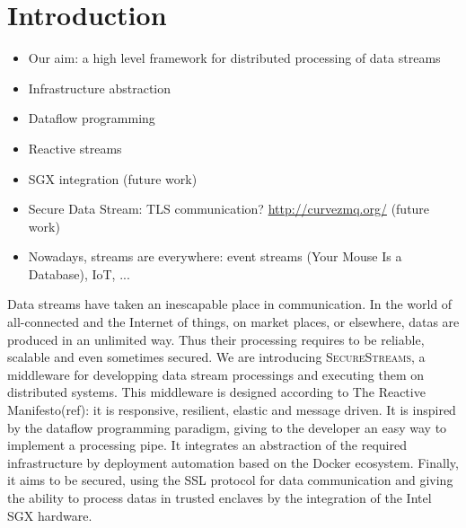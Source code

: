 \section{Introduction}
\label{sec:introduction}

\begin{itemize}
  \item Our aim: a high level framework for distributed processing of data streams
  \item Infrastructure abstraction
  \item Dataflow programming
  \item Reactive streams
  \item SGX integration (future work)
  \item Secure Data Stream: TLS communication? \url{http://curvezmq.org/} (future work)
  \item Nowadays, streams are everywhere: event streams (Your Mouse Is a Database), IoT, ...
\end{itemize}

Data streams have taken an inescapable place in communication.
In the world of all-connected and the Internet of things, on market places, or elsewhere, datas are produced in an unlimited way.
Thus their processing requires to be reliable, scalable and even sometimes secured.
We are introducing \textsc{SecureStreams}, a middleware for developping data stream processings and executing them on distributed systems.
This middleware is designed according to The Reactive Manifesto(ref): it is responsive, resilient, elastic and message driven.
It is inspired by the dataflow programming paradigm, giving to the developer an easy way to implement a processing pipe.
It integrates an abstraction of the required infrastructure by deployment automation based on the Docker ecosystem.
Finally, it aims to be secured, using the SSL protocol for data communication and giving the ability to process datas in trusted enclaves by the integration of the Intel SGX hardware.

